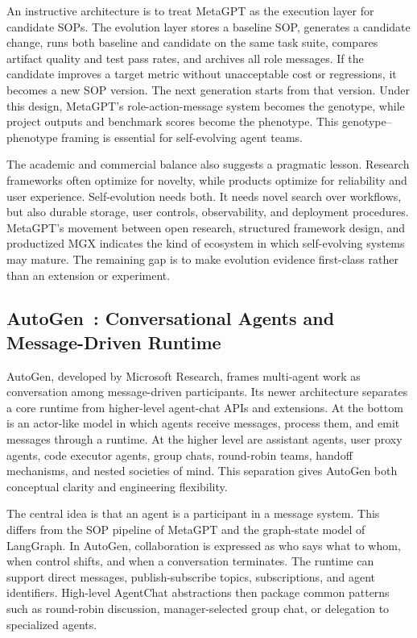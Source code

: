An instructive architecture is to treat MetaGPT as the execution layer for candidate SOPs.  The evolution layer stores a baseline SOP, generates a candidate change, runs both baseline and candidate on the same task suite, compares artifact quality and test pass rates, and archives all role messages.  If the candidate improves a target metric without unacceptable cost or regressions, it becomes a new SOP version.  The next generation starts from that version.  Under this design, MetaGPT's role-action-message system becomes the genotype, while project outputs and benchmark scores become the phenotype.  This genotype--phenotype framing is essential for self-evolving agent teams.

The academic and commercial balance also suggests a pragmatic lesson.  Research frameworks often optimize for novelty, while products optimize for reliability and user experience.  Self-evolution needs both.  It needs novel search over workflows, but also durable storage, user controls, observability, and deployment procedures.  MetaGPT's movement between open research, structured framework design, and productized MGX indicates the kind of ecosystem in which self-evolving systems may mature.  The remaining gap is to make evolution evidence first-class rather than an extension or experiment.

\subsection{AutoGen~\cite{autogen2023}: Conversational Agents and Message-Driven Runtime}
\label{subsec:autogen}

AutoGen, developed by Microsoft Research, frames multi-agent work as conversation among message-driven participants.  Its newer architecture separates a core runtime from higher-level agent-chat APIs and extensions.  At the bottom is an actor-like model in which agents receive messages, process them, and emit messages through a runtime.  At the higher level are assistant agents, user proxy agents, code executor agents, group chats, round-robin teams, handoff mechanisms, and nested societies of mind.  This separation gives AutoGen both conceptual clarity and engineering flexibility.

The central idea is that an agent is a participant in a message system.  This differs from the SOP pipeline of MetaGPT and the graph-state model of LangGraph.  In AutoGen, collaboration is expressed as who says what to whom, when control shifts, and when a conversation terminates.  The runtime can support direct messages, publish-subscribe topics, subscriptions, and agent identifiers.  High-level AgentChat abstractions then package common patterns such as round-robin discussion, manager-selected group chat, or delegation to specialized agents.

